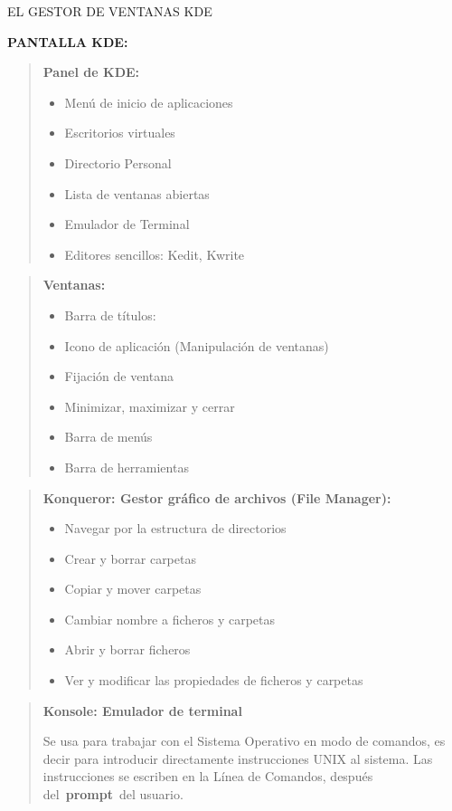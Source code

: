 \documentclass[
  letterpaper,
]{article}
\providecommand{\tightlist}{%
  \setlength{\itemsep}{0pt}\setlength{\parskip}{0pt}}\usepackage{longtable,booktabs,array}
\begin{document}
EL GESTOR DE VENTANAS KDE

\textbf{PANTALLA KDE:}

\begin{quote}
\textbf{Panel de KDE:}

\begin{itemize}
\tightlist
\item
  Menú de inicio de aplicaciones
\item
  Escritorios virtuales
\item
  Directorio Personal
\item
  Lista de ventanas abiertas
\item
  Emulador de Terminal
\item
  Editores sencillos: Kedit, Kwrite
\end{itemize}
\end{quote}

\begin{quote}
\textbf{Ventanas:}

\begin{itemize}
\item
  Barra de títulos:
\item
  Icono de aplicación (Manipulación de ventanas)
\item
  Fijación de ventana
\item
  Minimizar, maximizar y cerrar
\item
  Barra de menús
\item
  Barra de herramientas
\end{itemize}
\end{quote}

\begin{quote}
\textbf{Konqueror: Gestor gráfico de archivos (File Manager):}

\begin{itemize}
\tightlist
\item
  Navegar por la estructura de directorios
\item
  Crear y borrar carpetas
\item
  Copiar y mover carpetas
\item
  Cambiar nombre a ficheros y carpetas
\item
  Abrir y borrar ficheros
\item
  Ver y modificar las propiedades de ficheros y carpetas
\end{itemize}
\end{quote}

\begin{quote}
\textbf{Konsole: Emulador de terminal}

Se usa para trabajar con el Sistema Operativo en modo de comandos, es
decir para introducir directamente instrucciones UNIX al sistema. Las
instrucciones se escriben en la Línea de Comandos, después
del~\textbf{prompt}~del usuario.
\end{quote}
\end{document}
